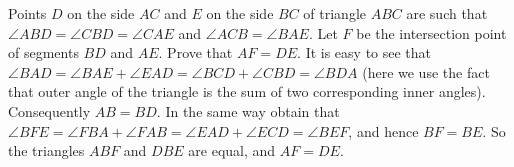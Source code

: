 \problem
Points $D$ on the side $AC$ and $E$ on the side $BC$ of triangle $ABC$ are such
that $\angle ABD = \angle CBD = \angle CAE$ and $\angle ACB = \angle BAE$.
Let $F$ be the intersection point of segments $BD$ and $AE$.
Prove that $AF = DE$.
\solution
It is easy to see that
\(
    \angle BAD = \angle BAE + \angle EAD
=
    \angle BCD + \angle CBD = \angle BDA
\)
(here we use the fact that outer angle of the triangle is the sum of two corresponding inner angles). Consequently $AB = BD$. In the same way obtain that
\(
    \angle BFE = \angle FBA + \angle FAB
=
    \angle EAD + \angle ECD = \angle BEF
\), and hence $BF=BE$. So the triangles $ABF$ and $DBE$ are equal, and $AF = DE$.
\endproblem
